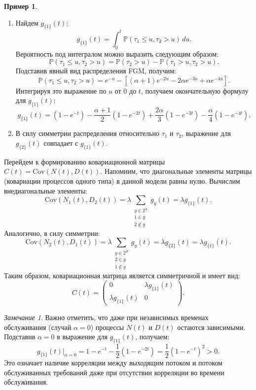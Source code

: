 \documentclass[12pt]{article}
\theoremstyle{plain}
\theoremstyle{definition}
\newtheorem{example}{Пример}[section]
\theoremstyle{remark}
\newtheorem{remark}{Замечание}[section]
\begin{document}
\begin{example}
\begin{enumerate}
    \item Найдем $g_{\{1\}}(t)$:
    \[
        g_{\{1\}}(t) = \int_0^t \mathbb{P}(\tau_1 \le u, \tau_2 > u) \, du.
    \]
    Вероятность под интегралом можно выразить следующим образом:
    \[
        \mathbb{P}(\tau_1 \le u, \tau_2 > u) = \mathbb{P}(\tau_2 > u) - \mathbb{P}(\tau_1 > u, \tau_2 > u).
    \]
    Подставив явный вид распределения FGM, получим:
    \[
        \mathbb{P}(\tau_1 \le u, \tau_2 > u) = e^{-u} - \left[ (\alpha + 1)e^{-2u} - 2\alpha e^{-3u} + \alpha e^{-4u} \right].
    \]
    Интегрируя это выражение по $u$ от 0 до $t$, получаем окончательную формулу для $g_{\{1\}}(t)$:
    \[
        g_{\{1\}}(t) = (1 - e^{-t}) - \frac{\alpha + 1}{2}(1-e^{-2t}) + \frac{2\alpha}{3}(1-e^{-3t}) - \frac{\alpha}{4}(1 - e^{-4t}).
    \]

    \item В силу симметрии распределения относительно $\tau_1$ и $\tau_2$, выражение для $g_{\{2\}}(t)$ совпадает с $g_{\{1\}}(t)$.
\end{enumerate}

Перейдем к формированию ковариационной матрицы $C(t) = \mathrm{Cov}(N(t), D(t))$.
Напомним, что диагональные элементы матрицы (ковариации процессов одного типа) в данной модели равны нулю. Вычислим внедиагональные элементы:
\[
    \mathrm{Cov}(N_1(t), D_2(t)) = \lambda \sum_{\substack{y \in 2^S \\ 1 \in y \\ 2 \notin y}} g_y(t) = \lambda g_{\{1\}}(t).
\]
Аналогично, в силу симметрии:
\[
    \mathrm{Cov}(N_2(t), D_1(t)) = \lambda \sum_{\substack{y \in 2^S \\ 2 \in y \\ 1 \notin y}} g_y(t) = \lambda g_{\{2\}}(t) = \lambda g_{\{1\}}(t).
\]
Таким образом, ковариационная матрица является симметричной и имеет вид:
\[
C(t) = 
\begin{pmatrix}
    0 & \lambda g_{\{1\}}(t) \\
    \lambda g_{\{1\}}(t) & 0
\end{pmatrix}.
\]


\begin{remark}
    Важно отметить, что даже при независимых временах обслуживания (случай $\alpha = 0$) процессы $N(t)$ и $D(t)$ остаются зависимыми. Подставив $\alpha = 0$ в выражение для $g_{\{1\}}(t)$, получаем:
    \[
        g_{\{1\}}(t)\bigg|_{\alpha=0} = 1 - e^{-t} - \frac{1}{2}(1-e^{-2t}) = \frac{1}{2}(1-e^{-t})^2 > 0.
    \]
    Это означает наличие корреляции между выходящим потоком и потоком обслуживанных требований даже при отсутствии корреляции во времени обслуживания.
\end{remark}


\end{example}
\end{document}
